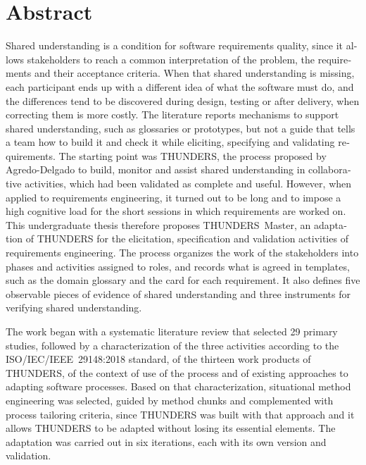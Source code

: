 \documentclass[12pt,letterpaper,oneside]{report}
\begin{document}
\chapter*{Abstract}
\thispagestyle{plain}
\begin{otherlanguage}{english}
Shared understanding is a condition for software requirements quality, since it
allows stakeholders to reach a common interpretation of the problem, the
requirements and their acceptance criteria. When that shared understanding is
missing, each participant ends up with a different idea of what the software
must do, and the differences tend to be discovered during design, testing or
after delivery, when correcting them is more costly. The literature reports
mechanisms to support shared understanding, such as glossaries or prototypes,
but not a guide that tells a team how to build it and check it while eliciting,
specifying and validating requirements. The starting point was THUNDERS, the
process proposed by Agredo-Delgado to build, monitor and assist shared
understanding in collaborative activities, which had been validated as complete
and useful. However, when applied to requirements engineering, it turned out to
be long and to impose a high cognitive load for the short sessions in which
requirements are worked on. This undergraduate thesis therefore proposes
THUNDERS~Master, an adaptation of THUNDERS for the elicitation, specification
and validation activities of requirements engineering. The process organizes
the work of the stakeholders into phases and activities assigned to roles, and
records what is agreed in templates, such as the domain glossary and the card
for each requirement. It also defines five observable pieces of evidence of
shared understanding and three instruments for verifying shared understanding.

The work began with a systematic literature review that selected 29 primary
studies, followed by a characterization of the three activities according to the
ISO/\allowbreak IEC/\allowbreak IEEE~29148:2018 standard, of the thirteen work
products of THUNDERS, of the context of use of the process and of existing
approaches to adapting software processes. Based on that characterization,
situational method engineering was selected, guided by method chunks and
complemented with process tailoring criteria, since THUNDERS was built with that
approach and it allows THUNDERS to be adapted without losing its essential
elements. The adaptation was carried out in six iterations, each with its own
version and validation.


\end{otherlanguage}
\end{document}
